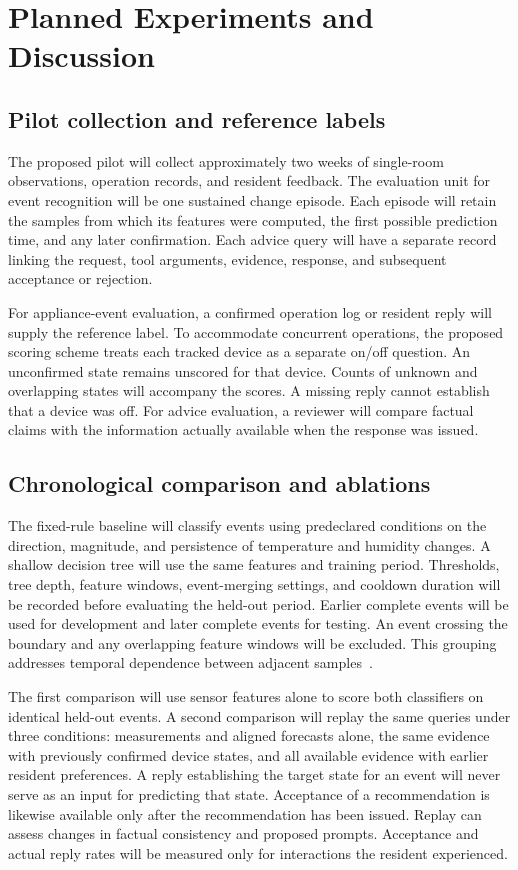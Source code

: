 \section{Planned Experiments and Discussion}\label{sec:experiments}
\subsection{Pilot collection and reference labels}
The proposed pilot will collect approximately two weeks of single-room observations, operation records, and resident feedback. The evaluation unit for event recognition will be one sustained change episode. Each episode will retain the samples from which its features were computed, the first possible prediction time, and any later confirmation. Each advice query will have a separate record linking the request, tool arguments, evidence, response, and subsequent acceptance or rejection.

For appliance-event evaluation, a confirmed operation log or resident reply will supply the reference label. To accommodate concurrent operations, the proposed scoring scheme treats each tracked device as a separate on/off question. An unconfirmed state remains unscored for that device. Counts of unknown and overlapping states will accompany the scores. A missing reply cannot establish that a device was off. For advice evaluation, a reviewer will compare factual claims with the information actually available when the response was issued.

\subsection{Chronological comparison and ablations}
The fixed-rule baseline will classify events using predeclared conditions on the direction, magnitude, and persistence of temperature and humidity changes. A shallow decision tree will use the same features and training period. Thresholds, tree depth, feature windows, event-merging settings, and cooldown duration will be recorded before evaluating the held-out period. Earlier complete events will be used for development and later complete events for testing. An event crossing the boundary and any overlapping feature windows will be excluded. This grouping addresses temporal dependence between adjacent samples~\cite{roberts}.

The first comparison will use sensor features alone to score both classifiers on identical held-out events. A second comparison will replay the same queries under three conditions: measurements and aligned forecasts alone, the same evidence with previously confirmed device states, and all available evidence with earlier resident preferences. A reply establishing the target state for an event will never serve as an input for predicting that state. Acceptance of a recommendation is likewise available only after the recommendation has been issued. Replay can assess changes in factual consistency and proposed prompts. Acceptance and actual reply rates will be measured only for interactions the resident experienced.

